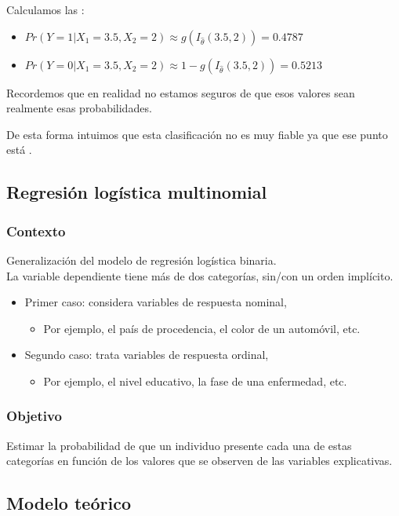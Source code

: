 Calculamos las :
\begin{itemize}
	\item $Pr(Y=1|X_1=3.5,X_2=2)\approx g(I_{\hat{\theta}}(3.5,2))=0.4787$
	\item $Pr(Y=0|X_1=3.5,X_2=2)\approx1- g(I_{\hat{\theta}}(3.5,2))=0.5213$
\end{itemize}
Recordemos que en realidad no estamos seguros de que esos valores sean realmente esas probabilidades.

De esta forma intuimos que esta clasificación no es muy fiable ya que ese punto está .
\subsection{Regresión logística multinomial}
\subsubsection{Contexto}
Generalización del modelo de regresión logística binaria.\\
La variable dependiente tiene más de dos categorías, sin/con un orden implícito.
\begin{itemize}
\item Primer caso: considera variables de respuesta nominal,
\begin{itemize}
	\item Por ejemplo, el país de procedencia, el color de un automóvil, etc.
\end{itemize}
\item Segundo caso: trata variables de respuesta ordinal,
\begin{itemize}
	\item Por ejemplo, el nivel educativo, la fase de una enfermedad, etc.
\end{itemize}
\end{itemize}
\subsubsection{Objetivo}
Estimar la probabilidad de que un individuo presente cada una de estas categorías en función de los valores que se observen de las variables explicativas.
\subsection{Modelo teórico}
